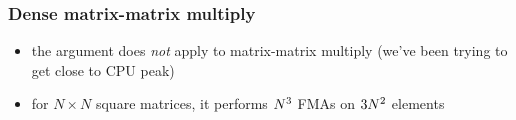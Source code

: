 \documentclass[12pt,dvipdfmx]{beamer}
\newcommand{\ao}[1]{{\color{blue}#1}}
\newcommand{\aka}[1]{{\color{red}#1}}
\begin{document}
\begin{frame}
\frametitle{Dense matrix\ao{-matrix} multiply}
\begin{itemize}
\item<1-> the argument does \ao{\em not} apply to matrix-matrix
  multiply (we've been trying to get close to CPU peak)
  \begin{center}
  \def\svgwidth{0.5\textwidth}
  {\scriptsize }
  \end{center}
  
\item<2-> for $N\times N$ square matrices,
  it performs $\ao{N^3}$ FMAs on $3 \ao{N^2}$ elements


\end{itemize}
\end{frame}
\end{document}
